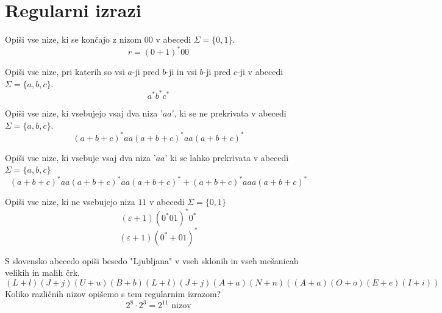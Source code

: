\documentclass[10pt,a4paper,oneside]{book}
\begin{document}
\pagebreak
\section{Regularni izrazi}\label{sec:RI}
\begin{primeri}
\item Opiši vse nize, ki se končajo z nizom $00$ v abecedi $\Sigma = \{ 0,1 \}$.
	\[ r = (0+1)^*00 \]
	\item Opiši vse nize, pri katerih so vsi $a$-ji pred $b$-ji in vsi $b$-ji pred $c$-ji v abecedi $\Sigma = \{ a,b,c \}$.
		\[ a^*b^*c^* \]
	\item Opiši vse nize, ki vsebujejo vsaj dva niza '$aa$', ki se ne prekrivata v abecedi $\Sigma = \{ a,b,c \}$.
		\[ (a+b+c)^* aa (a+b+c)^* aa (a+b+c)^* \]
	\item Opiši vse nize, ki vsebuje vsaj dva niza '$aa$' ki se lahko prekrivata v abecedi $\Sigma = \{ a,b,c \}$
		\[ (a+b+c)^* aa (a+b+c)^* aa (a+b+c)^* + (a+b+c)^* aaa (a+b+c)^* \]
	\item Opiši vse nize, ki ne vsebujejo niza $11$ v abecedi $\Sigma = \{ 0,1 \}$
		\[ (\varepsilon  + 1 )(0^*01)^* 0^*	\]
		\[ (\varepsilon  + 1 )(0^* + 01)^* \]
	\item S slovensko abecedo opiši besedo "Ljubljana" v vseh sklonih in vseh mešanicah velikih in malih črk.
		\[ (L+l)(J+j)(U+u)(B+b)(L+l)(J+j)(A+a)(N+n)( (A+a)(O+o)(E+e)(I+i) ) \]
		Koliko različnih nizov opišemo s tem regularnim izrazom?\\
		\[ 2^8 \cdot 2^3 = 2^{11} \mbox{ nizov} \]
\end{primeri}
\end{document}
